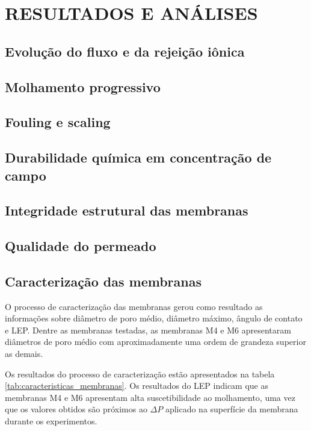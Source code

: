 \chapter{RESULTADOS E ANÁLISES}

\section{Evolução do fluxo e da rejeição iônica}

\section{Molhamento progressivo}

\section{Fouling e scaling}

\section{Durabilidade química em concentração de campo}

\section{Integridade estrutural das membranas}

\section{Qualidade do permeado}

\section{Caracterização das membranas}

O processo de caracterização das membranas gerou como resultado as informações sobre diâmetro de poro médio, diâmetro máximo, ângulo de contato e LEP. Dentre as membranas testadas, as membranas M4 e M6 apresentaram diâmetros de poro médio com aproximadamente uma ordem de grandeza superior as demais. 

Os resultados do processo de caracterização estão apresentados na tabela \ref{tab:caracteristicas_membranas}. Os resultados do LEP indicam que as membranas M4 e M6 apresentam alta suscetibilidade ao molhamento, uma vez que os valores obtidos são próximos ao $\Delta P$ aplicado na superfície da membrana durante os experimentos.

